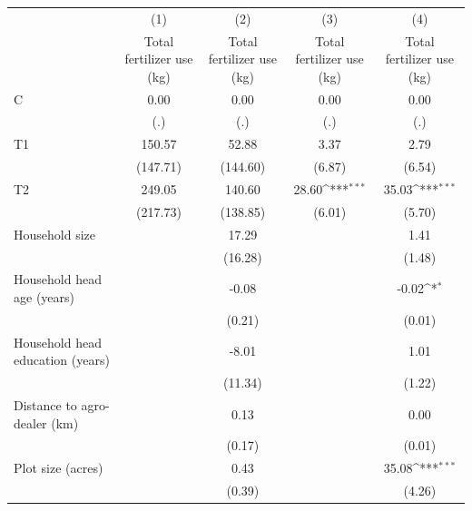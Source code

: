 {
\def\sym#1{\ifmmode^{#1}\else\(^{#1}\)\fi}
\begin{tabular}{l*{4}{c}}
\hline\hline
                &\multicolumn{1}{c}{(1)}&\multicolumn{1}{c}{(2)}&\multicolumn{1}{c}{(3)}&\multicolumn{1}{c}{(4)}\\
                &\multicolumn{1}{c}{Total fertilizer use (kg)}&\multicolumn{1}{c}{Total fertilizer use (kg)}&\multicolumn{1}{c}{Total fertilizer use (kg)}&\multicolumn{1}{c}{Total fertilizer use (kg)}\\
\hline
C               &     0.00         &     0.00         &     0.00         &     0.00         \\
                &      (.)         &      (.)         &      (.)         &      (.)         \\
T1              &   150.57         &    52.88         &     3.37         &     2.79         \\
                & (147.71)         & (144.60)         &   (6.87)         &   (6.54)         \\
T2              &   249.05         &   140.60         &    28.60\sym{***}&    35.03\sym{***}\\
                & (217.73)         & (138.85)         &   (6.01)         &   (5.70)         \\
Household size  &                  &    17.29         &                  &     1.41         \\
                &                  &  (16.28)         &                  &   (1.48)         \\
Household head age (years)&                  &    -0.08         &                  &    -0.02\sym{*}  \\
                &                  &   (0.21)         &                  &   (0.01)         \\
Household head education (years)&                  &    -8.01         &                  &     1.01         \\
                &                  &  (11.34)         &                  &   (1.22)         \\
Distance to agro-dealer (km)&                  &     0.13         &                  &     0.00         \\
                &                  &   (0.17)         &                  &   (0.01)         \\
Plot size (acres)&                  &     0.43         &                  &    35.08\sym{***}\\
                &                  &   (0.39)         &                  &   (4.26)         \\

\end{tabular}}
